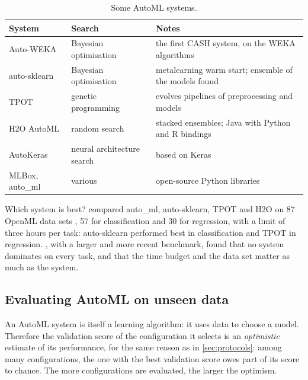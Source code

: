 \begin{table}[htbp]
\centering\small
\caption{Some AutoML systems.}\label{tab:automlsystems}
\begin{tabularx}{\textwidth}{@{}llX@{}}
\toprule
System & Search & Notes\\
\midrule
Auto-WEKA & Bayesian optimisation & the first CASH system, on the WEKA algorithms\\
auto-sklearn & Bayesian optimisation & metalearning warm start; ensemble of the models found\\
TPOT & genetic programming & evolves pipelines of preprocessing and models\\
H2O AutoML & random search & stacked ensembles; Java with Python and R bindings\\
AutoKeras & neural architecture search & based on Keras\\
MLBox, auto\_ml & various & open-source Python libraries\\
\bottomrule
\end{tabularx}
\end{table}

Which system is best? \citet{balaji2018benchmarking} compared auto\_ml, auto-sklearn, TPOT and H2O on 87
OpenML data sets \citep{vanschoren2013openml}, 57 for classification and 30 for regression, with a limit
of three hours per task: auto-sklearn performed best in classification and TPOT in regression. \citet{gijsbers2024amlb}, with a larger
and more recent benchmark, found that no system dominates on every task, and
that the time budget and the data set matter as much as the system.

\subsection{Evaluating AutoML on unseen data}

An AutoML system is itself a learning algorithm: it uses data to choose a model. Therefore the
validation score of the configuration it selects is an \emph{optimistic} estimate of its performance,
for the same reason as in \cref{sec:protocols}: among many configurations, the one with the best
validation score owes part of its score to chance. The more configurations are evaluated, the larger the
optimism.

